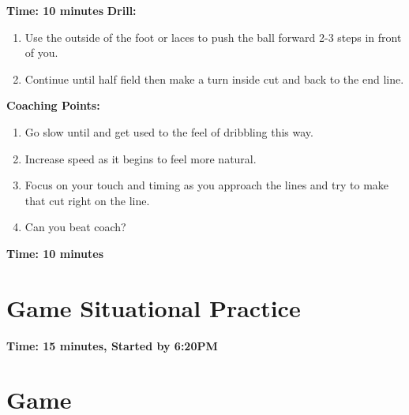 \documentclass[10pt,letterpaper]{article}
\newenvironment{oddBlock}[1]{%
    \tcolorbox[beamer,%
    noparskip,breakable,
    colback=LightBlue,colframe=DarkBlue,%
    colbacklower=DarkBlue!75!LightBlue,%
    title=#1]}%
    {\endtcolorbox}
\begin{document}
\textbf{Time: 10 minutes}
\begin{oddBlock}{Straight line dribbling at speed ( 10 min )}
    \textbf{Drill:}
    \begin{enumerate}
        \setlength{\itemsep}{0pt}
        \setlength{\parskip}{0pt}
        \setlength{\parsep}{0pt}
        \item Use the outside of the foot or laces to push the ball forward 2-3 steps in front of you.
        \item Continue until half field then make a turn inside cut and back to the end line.
    \end{enumerate}
    \textbf{Coaching Points:}
    \begin{enumerate}
        \setlength{\itemsep}{0pt}
        \setlength{\parskip}{0pt}
        \setlength{\parsep}{0pt}
        \item Go slow until and get used to the feel of dribbling this way.
        \item Increase speed as it begins to feel more natural.
        \item Focus on your touch and timing as you approach the lines and try to make that cut right on the line.
        \item Can you beat coach?
    \end{enumerate}
\end{oddBlock}

\textbf{Time: 10 minutes}



\section{Game Situational Practice}
\textbf{Time: 15 minutes, Started by 6:20PM}


%

%

\section{Game}
\end{document}

